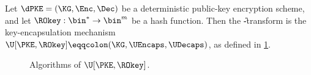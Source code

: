   \begin{definition}[\U-transform]\label{def:U-transform}
    Let $\dPKE = (\KG, \Enc, \Dec)$ be a deterministic public-key encryption scheme, and let 
    $\ROkey: \bin^* \to \bin^m$ be a hash function.
    Then the \U-transform is the key-encapsulation mechanism 
    $\U[\PKE, \ROkey] \eqqcolon (\KG, \UEncaps, \UDecaps)$, as defined in \cref{fig:def:U-transform}.
    \begin{figure}[ht]
   	  \begin{center}
  	  \end{center}
  	  \caption{
  	    \label{fig:def:U-transform}			
         Algorithms of $\U[\PKE, \ROkey]$.
      }
    \end{figure} 
  \end{definition}

